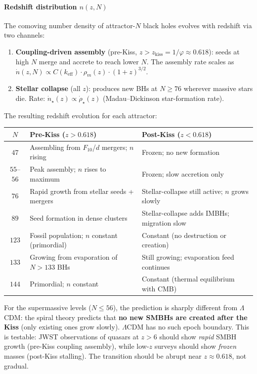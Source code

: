 \documentclass[12pt,a4paper]{article}
\begin{document}
\paragraph{Redshift distribution $n(z, N)$}
\label{sec:bh-redshift}

The comoving number density of attractor-$N$ black holes evolves with redshift via two channels:
\begin{enumerate}[nosep]
\item \textbf{Coupling-driven assembly} (pre-Kiss, $z > z_{\mathrm{kiss}} = 1/\varphi \approx 0.618$): seeds at high $N$ merge and accrete to reach lower $N$.  The assembly rate scales as $\dot{n}(z, N) \propto C(k_{\mathrm{eff}}) \cdot \rho_m(z) \cdot (1+z)^{3/2}$.
\item \textbf{Stellar collapse} (all $z$): produces new BHs at $N \geq 76$ wherever massive stars die.  Rate: $\dot{n}_\star(z) \propto \dot{\rho}_\star(z)$ (Madau--Dickinson star-formation rate).
\end{enumerate}

The resulting redshift evolution for each attractor:

\begin{center}\small
\begin{tabular}{c|p{4.2cm}|p{4.2cm}}
$N$ & Pre-Kiss ($z > 0.618$) & Post-Kiss ($z < 0.618$) \\
\hline
$47$ & Assembling from $F_{10}$/$d$ mergers; $n$ rising & Frozen; no new formation \\
$55$--$56$ & Peak assembly; $n$ rises to maximum & Frozen; slow accretion only \\
$76$ & Rapid growth from stellar seeds + mergers & Stellar-collapse still active; $n$ grows slowly \\
$89$ & Seed formation in dense clusters & Stellar-collapse adds IMBHs; migration slow \\
$123$ & Fossil population; $n$ constant (primordial) & Constant (no destruction or creation) \\
$133$ & Growing from evaporation of $N > 133$ BHs & Still growing; evaporation feed continues \\
$144$ & Primordial; $n$ constant & Constant (thermal equilibrium with CMB) \\
\end{tabular}
\end{center}

\noindent For the supermassive levels ($N \leq 56$), the prediction is sharply different from $\Lambda$CDM: the spiral theory predicts that \textbf{no new SMBHs are created after the Kiss} (only existing ones grow slowly).  $\Lambda$CDM has no such epoch boundary.  This is testable: JWST observations of quasars at $z > 6$ should show \emph{rapid} SMBH growth (pre-Kiss coupling assembly), while low-$z$ surveys should show \emph{frozen} masses (post-Kiss stalling).  The transition should be abrupt near $z \approx 0.618$, not gradual.
\end{document}
